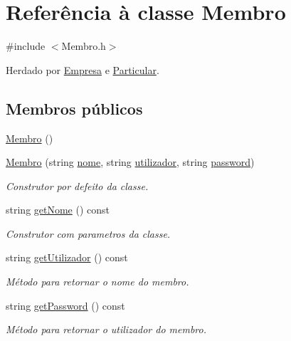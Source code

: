 \hypertarget{class_membro}{\section{Referência à classe Membro}
\label{class_membro}
}


{\ttfamily \#include $<$Membro.\+h$>$}



Herdado por \hyperlink{class_empresa}{Empresa} e \hyperlink{class_particular}{Particular}.

\subsection*{Membros públicos}
\begin{DoxyCompactItemize}
\item 
\hyperlink{class_membro_a29dfd4ec647ea5cdefcd11d85deb5d1d}{Membro} ()
\item 
\hyperlink{class_membro_a2dc48d0c0febf2d3270128734bdce7d0}{Membro} (string \hyperlink{class_membro_a2598bbe34ae32a98f41468b2202a9555}{nome}, string \hyperlink{class_membro_a42cc733ff94ec8d1bbfdacc62dfbb0e7}{utilizador}, string \hyperlink{class_membro_ae2b12fc3e91efc674c07e735edf4ac21}{password})
\begin{DoxyCompactList}\small\item\em Construtor por defeito da classe. \end{DoxyCompactList}\item 
string \hyperlink{class_membro_af7cfd42d45960183ccf1002246cb0bd2}{get\+Nome} () const 
\begin{DoxyCompactList}\small\item\em Construtor com parametros da classe. \end{DoxyCompactList}\item 
string \hyperlink{class_membro_ae124b54c2b8572e531c873788263222d}{get\+Utilizador} () const 
\begin{DoxyCompactList}\small\item\em Método para retornar o nome do membro. \end{DoxyCompactList}\item 
string \hyperlink{class_membro_af9c84eb5f83b1fd64d4c542f419d6953}{get\+Password} () const 
\begin{DoxyCompactList}\small\item\em Método para retornar o utilizador do membro. \end{DoxyCompactList}\item 

\end{DoxyCompactItemize}
